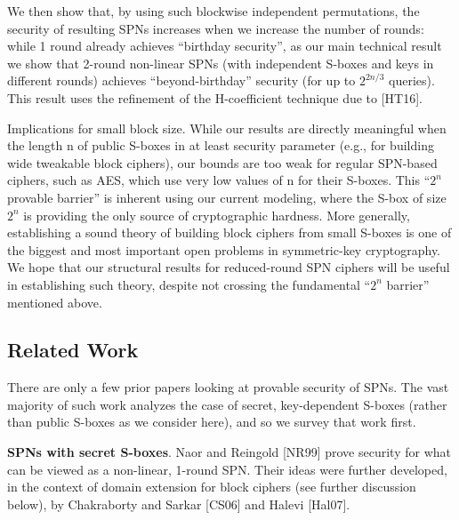 We then show that, by using such blockwise independent permutations, the
security of resulting SPNs increases when we increase the number of rounds:
while 1 round already achieves ``birthday security'', as our main technical result
we show that 2-round non-linear SPNs (with independent S-boxes and keys in
different rounds) achieves ``beyond-birthday'' security (for up to $2^{2n/3}$ queries).
This result uses the refinement of the H-coefficient technique due to [HT16].






Implications for small block size. While our results are directly meaningful
when the length n of public S-boxes in at least security parameter (e.g., for
building wide tweakable block ciphers), our bounds are too weak for regular SPN-based
ciphers, such as AES, which use very low values of n for their S-boxes.
This ``$2^n$ provable barrier'' is inherent using our current modeling, where the
S-box of size $2^n$ is providing the only source of cryptographic hardness. More
generally, establishing a sound theory of building block ciphers from small S-boxes is one of the biggest and most important open problems in symmetric-key
cryptography. We hope that our structural results for reduced-round SPN ciphers will be useful in establishing such theory, despite not crossing the fundamental ``$2^n$ barrier'' mentioned above.



%
%
%



\subsection{Related Work}


There are only a few prior papers looking at provable security of SPNs. The vast
majority of such work analyzes the case of secret, key-dependent S-boxes (rather
than public S-boxes as we consider here), and so we survey that work first.



{\bf SPNs with secret S-boxes}. Naor and Reingold [NR99] prove security for
what can be viewed as a non-linear, 1-round SPN. Their ideas were further
developed, in the context of domain extension for block ciphers (see further
discussion below), by Chakraborty and Sarkar [CS06] and Halevi [Hal07].


